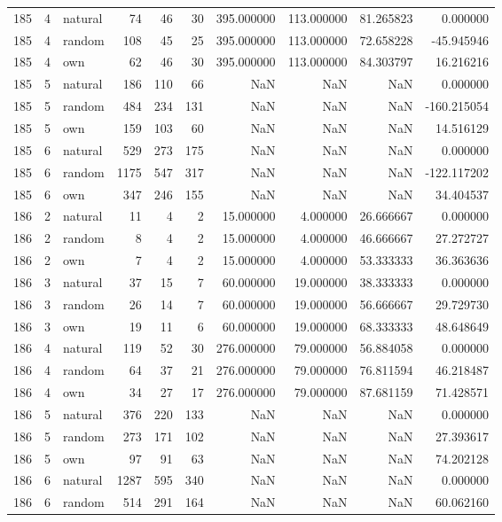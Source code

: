 \begin{table}[htbp]
\begin{tabular}{rrlrrrrrrr}
185 & 4 & natural & 74 & 46 & 30 & 395.000000 & 113.000000 & 81.265823 & 0.000000 \\
185 & 4 & random & 108 & 45 & 25 & 395.000000 & 113.000000 & 72.658228 & -45.945946 \\
185 & 4 & own & 62 & 46 & 30 & 395.000000 & 113.000000 & 84.303797 & 16.216216 \\
185 & 5 & natural & 186 & 110 & 66 & NaN & NaN & NaN & 0.000000 \\
185 & 5 & random & 484 & 234 & 131 & NaN & NaN & NaN & -160.215054 \\
185 & 5 & own & 159 & 103 & 60 & NaN & NaN & NaN & 14.516129 \\
185 & 6 & natural & 529 & 273 & 175 & NaN & NaN & NaN & 0.000000 \\
185 & 6 & random & 1175 & 547 & 317 & NaN & NaN & NaN & -122.117202 \\
185 & 6 & own & 347 & 246 & 155 & NaN & NaN & NaN & 34.404537 \\
186 & 2 & natural & 11 & 4 & 2 & 15.000000 & 4.000000 & 26.666667 & 0.000000 \\
186 & 2 & random & 8 & 4 & 2 & 15.000000 & 4.000000 & 46.666667 & 27.272727 \\
186 & 2 & own & 7 & 4 & 2 & 15.000000 & 4.000000 & 53.333333 & 36.363636 \\
186 & 3 & natural & 37 & 15 & 7 & 60.000000 & 19.000000 & 38.333333 & 0.000000 \\
186 & 3 & random & 26 & 14 & 7 & 60.000000 & 19.000000 & 56.666667 & 29.729730 \\
186 & 3 & own & 19 & 11 & 6 & 60.000000 & 19.000000 & 68.333333 & 48.648649 \\
186 & 4 & natural & 119 & 52 & 30 & 276.000000 & 79.000000 & 56.884058 & 0.000000 \\
186 & 4 & random & 64 & 37 & 21 & 276.000000 & 79.000000 & 76.811594 & 46.218487 \\
186 & 4 & own & 34 & 27 & 17 & 276.000000 & 79.000000 & 87.681159 & 71.428571 \\
186 & 5 & natural & 376 & 220 & 133 & NaN & NaN & NaN & 0.000000 \\
186 & 5 & random & 273 & 171 & 102 & NaN & NaN & NaN & 27.393617 \\
186 & 5 & own & 97 & 91 & 63 & NaN & NaN & NaN & 74.202128 \\
186 & 6 & natural & 1287 & 595 & 340 & NaN & NaN & NaN & 0.000000 \\
186 & 6 & random & 514 & 291 & 164 & NaN & NaN & NaN & 60.062160 \\

\end{tabular}
\end{table}
